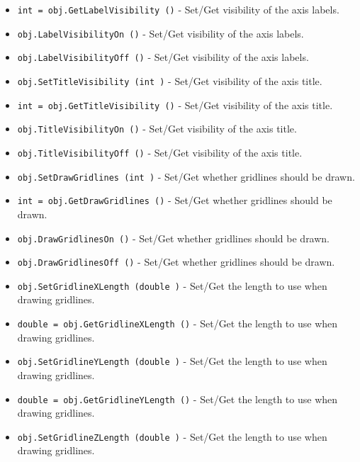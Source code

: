 \begin{itemize}
\item  \verb|int = obj.GetLabelVisibility ()| -  Set/Get visibility of the axis labels.

\item  \verb|obj.LabelVisibilityOn ()| -  Set/Get visibility of the axis labels.

\item  \verb|obj.LabelVisibilityOff ()| -  Set/Get visibility of the axis labels.

\item  \verb|obj.SetTitleVisibility (int )| -  Set/Get visibility of the axis title.

\item  \verb|int = obj.GetTitleVisibility ()| -  Set/Get visibility of the axis title.

\item  \verb|obj.TitleVisibilityOn ()| -  Set/Get visibility of the axis title.

\item  \verb|obj.TitleVisibilityOff ()| -  Set/Get visibility of the axis title.

\item  \verb|obj.SetDrawGridlines (int )| -  Set/Get whether gridlines should be drawn.

\item  \verb|int = obj.GetDrawGridlines ()| -  Set/Get whether gridlines should be drawn.

\item  \verb|obj.DrawGridlinesOn ()| -  Set/Get whether gridlines should be drawn.

\item  \verb|obj.DrawGridlinesOff ()| -  Set/Get whether gridlines should be drawn.

\item  \verb|obj.SetGridlineXLength (double )| -  Set/Get the length to use when drawing gridlines. 

\item  \verb|double = obj.GetGridlineXLength ()| -  Set/Get the length to use when drawing gridlines. 

\item  \verb|obj.SetGridlineYLength (double )| -  Set/Get the length to use when drawing gridlines. 

\item  \verb|double = obj.GetGridlineYLength ()| -  Set/Get the length to use when drawing gridlines. 

\item  \verb|obj.SetGridlineZLength (double )| -  Set/Get the length to use when drawing gridlines. 


\end{itemize}
